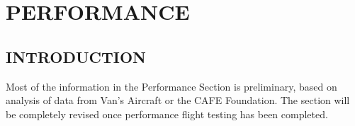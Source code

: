\chapter{PERFORMANCE}
\label{perf-sec-number}
\vspace{\minitocspacebefore}
\minitoc
\cleardoublepage

\renewcommand{\textfraction}{0.0} 
\renewcommand{\topfraction}{1} 
\renewcommand{\bottomfraction}{1} 
\renewcommand{\floatpagefraction}{0.35} 
\setcounter{totalnumber}{5} 

\section{INTRODUCTION}
Most of the information in the Performance Section is preliminary, based on analysis of
 data from Van's Aircraft or the CAFE Foundation.
The section will be completely revised once performance flight testing has been completed.
\clearpage




